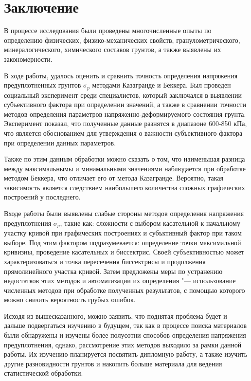 \chapter*{Заключение}                       %


В процессе исследования были проведены многочисленные опыты по определению физических, физико-механических свойств, гранулометрического, минералогического, химического составов грунтов, а также выявлены их закономерности. 

В ходе работы, удалось оценить и сравнить точность определения напряжения предуплотненных грунтов $\sigma_p$ методами Казагранде и Беккера. Был проведен социальный эксперимент среди специалистов, который заключался в выявлении субъективного фактора при определении значений, а также в сравнении точности методов определения параметров напряженно-деформируемого состояния грунта. Эксперимент показал, что полученные данные разнятся в диапазоне 600-850 кПа, что является обоснованием для утверждения о важности субъективного фактора при определении данных параметров.

Также по этим данным обработки можно сказать о том, что наименьшая разница между максимальнымы и минамальными значениями наблюдается при обработке методом Беккера, что отличает его от метода Казагранде. Вероятно, такая зависимость является следствием наибольшего количества сложных графических построений у последнего.

Входе работы были выявлены слабые стороны методов определения напряжения предуплотнения $\sigma_p$, такие как: сложности с выбором касательной к начальному участку кривой при графических построениях и субъктивный фактор при таком выборе. Под этим фактором подразумевается: определение точки максимальной кривизны, проведение касательных и биссектрис. Своей субъективностью может характеризоваться и точка пересечения биссектрисы и продолжения прямолинейного участка кривой.
Затем предложены меры по устранению недостатков этих методов и автоматизации их определения "--- использование численных методов при обработке полученных результатов, с помощью которого можно снизить вероятность грубых ошибок.


Исходя из вышесказанного, можно заявить, что поднятая проблема будет и дальше подвергаться изучению в будущем, так как в процессе поиска материалов были обнаружены и изучены более полусотни способов определения напряжения предуплотнения, однако, рассмотрение этих методов выходило за рамки данной работы. 
Их изучению планируется посвятить дипломную работу, а также изучить другие разновидности грунтов и накопить больше материала для ведения статистической обработки.

